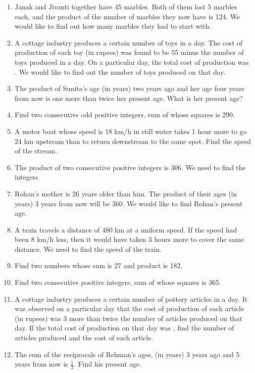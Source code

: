 \begin{enumerate}[label=\thesubsection.\arabic*,ref=\thesubsection.\theenumi]
%
	\item Janak and Jivanti together have 45 marbles. Both of them lost 5 marbles each, and the product of the number of marbles they now have is 124. We would like to find out how many marbles they had to start with.
\item  A cottage industry produces a certain number of toys in a day. The cost of production of each toy (in rupees) was found to be 55 minus the number of toys produced in a day. On a particular day, the total cost of production was . We would like to find out the number of toys produced on that day.
\item The product of Sunita’s age (in years) two years ago and her age four years from now is one more than twice her present age. What is her present age?
\item Find two consecutive odd positive integers, sum of whose squares is 290.
\item A motor boat whose speed is 18 km/h in still water takes 1 hour more to go 24 km upstream than to return downstream to the same spot. Find the speed of the stream.
%
\item The product of two consecutive positive integers is 306. We need to find the integers.
\item Rohan’s mother is 26 years older than him. The product of their ages (in years) 3 years from now will be 360. We would like to find Rohan’s present age.
\item A train travels a distance of 480 km at a uniform speed. If the speed had been 8 km/h less, then it would have taken 3 hours more to cover the same distance. We need to find the speed of the train.
\item Find two numbers whose sum is 27 and product is 182. 
\item  Find two consecutive positive integers, sum of whose squares is 365. 
\item  A cottage industry produces a certain number of pottery articles in a day. It was observed on a particular day that the cost of production of each article (in rupees) was 3 more than twice the number of articles produced on that day. If the total cost of production on that day was , find the number of articles produced and the cost of each article.\item The sum of the reciprocals of Rehman’s ages, (in years) 3 years ago and 5 years from now is $\frac{1}{3}$.  Find his present age.

\end{enumerate}
